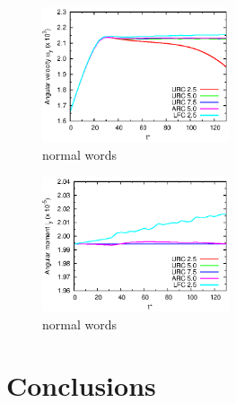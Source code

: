 \documentclass[aps,pre,preprint]{revtex4}
\begin{document}
\begin{figure}
  \centering
  \includegraphics[width=0.49\textwidth]{fig/wy.eps}
  \caption{normal words}
  \label{fig:tmp11}
\end{figure}

\begin{figure}
  \centering
  \includegraphics[width=0.49\textwidth]{fig/ly.eps}
  \caption{normal words}
  \label{fig:tmp12}
\end{figure}



\section{Conclusions}\label{sec:conclusion}



{}

\end{document}
